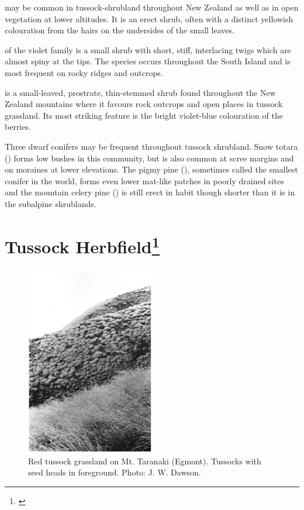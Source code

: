  may be common in tussock-shrubland throughout New Zealand as well as in open vegetation at lower altitudes.
It is an erect shrub, often with a distinct yellowish colouration from the hairs on the undersides of the small leaves.

 of the violet family is a small shrub with short, stiff, interlacing twigs which are almost spiny at the tips.
The species occurs throughout the South Island and is most frequent on rocky ridges and outcrops.

 is a small-leaved, prostrate, thin-stemmed shrub found throughout the New Zealand mountains where it favours rock outcrops and open places in tussock grassland.
Its most striking feature is the bright violet-blue colouration of the berries.

Three dwarf conifers may be frequent throughout tussock shrubland.
Snow totara () forms low bushes in this community, but is also common at scree margins and on moraines at lower elevations.
The pigmy pine (), sometimes called the smallest conifer in the world, forms even lower mat-like patches in poorly drained sites and the mountain celery pine () is still erect in habit though shorter than it is in the subalpine shrublands.

\section[Tussock Herbfield]{Tussock Herbfield\footnote{\cite{mark1980progress}}}

\begin{figure}
	\includegraphics[width=0.5\textwidth]{graphics/figure95red-tussock.jpg}
	\centering
	\caption[Red tussock grassland on Mt. Taranaki]{Red tussock grassland on Mt. Taranaki (Egmont).
	Tussocks with seed heads in foreground.
	Photo: J. W. Dawson.}%
	\label{fig:95red-tussock}
\end{figure}

